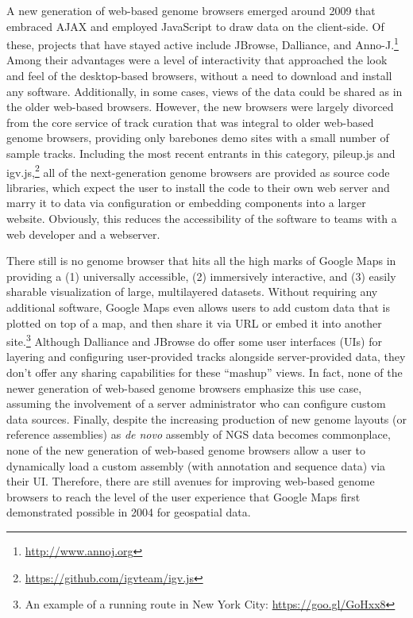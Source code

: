 A new generation of web-based genome browsers emerged around 2009 that embraced AJAX and employed JavaScript to draw data on the client-side. Of these, projects that have stayed active include JBrowse,\autocite{Buels2016} Dalliance,\autocite{Down2011} and Anno-J.\footnote{\url{http://www.annoj.org}} Among their advantages were a level of interactivity that approached the look and feel of the desktop-based browsers, without a need to download and install any software. Additionally, in some cases, views of the data could be shared as in the older web-based browsers. However, the new browsers were largely divorced from the core service of track curation that was integral to older web-based genome browsers, providing only barebones demo sites with a small number of sample tracks. Including the most recent entrants in this category, pileup.js\autocite{Vanderkam2016} and igv.js,\footnote{\url{https://github.com/igvteam/igv.js}} all of the next-generation genome browsers are provided as source code libraries, which expect the user to install the code to their own web server and marry it to data via configuration or embedding components into a larger website. Obviously, this reduces the accessibility of the software to teams with a web developer and a webserver.

There still is no genome browser that hits all the high marks of Google Maps in providing a (1) universally accessible, (2) immersively interactive, and (3) easily sharable visualization of large, multilayered datasets. Without requiring any additional software, Google Maps even allows users to add custom data that is plotted on top of a map, and then share it via URL or embed it into another site.\footnote{An example of a running route in New York City: \url{https://goo.gl/GoHxx8}} Although Dalliance and JBrowse do offer some user interfaces (UIs) for layering and configuring user-provided tracks alongside server-provided data, they don't offer any sharing capabilities for these ``mashup'' views. In fact, none of the newer generation of web-based genome browsers emphasize this use case, assuming the involvement of a server administrator who can configure custom data sources. Finally, despite the increasing production of new genome layouts (or reference assemblies) as \emph{de novo} assembly of NGS data becomes commonplace, none of the new generation of web-based genome browsers allow a user to dynamically load a custom assembly (with annotation and sequence data) via their UI. Therefore, there are still avenues for improving web-based genome browsers to reach the level of the user experience that Google Maps first demonstrated possible in 2004 for geospatial data.\autocite{Vincent2007}

